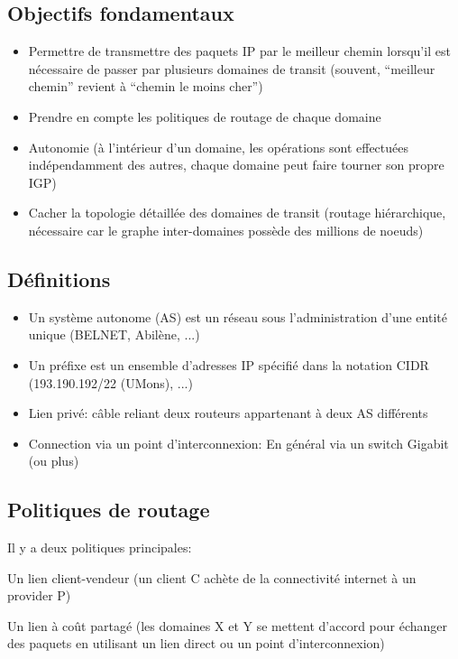 \documentclass{article}
\begin{document}
\begin{sffamily}
\subsection{Objectifs fondamentaux}

\begin{itemize}
\item Permettre de transmettre des paquets IP par le meilleur chemin
  lorsqu'il est nécessaire de passer par plusieurs domaines de transit
  (souvent, ``meilleur chemin'' revient à ``chemin le moins cher'')
\item Prendre en compte les politiques de routage de chaque domaine
\item Autonomie (à l'intérieur d'un domaine, les opérations sont
  effectuées indépendamment des autres, chaque domaine peut faire
  tourner son propre IGP)
\item Cacher la topologie détaillée des domaines de transit (routage
  hiérarchique, nécessaire car le graphe inter-domaines possède des
  millions de noeuds)
\end{itemize}

\subsection{Définitions}

\begin{itemize}
\item Un système autonome (AS) est un réseau sous l'administration
  d'une entité unique (BELNET, Abilène, ...)
\item Un préfixe est un ensemble d'adresses IP spécifié dans la
  notation CIDR (193.190.192/22 (UMons), ...)
\item Lien privé: câble reliant deux routeurs appartenant à deux AS
  différents
\item Connection via un point d'interconnexion: En général via un
  switch Gigabit (ou plus)
\end{itemize}

\subsection{Politiques de routage}

Il y a deux politiques principales:

Un lien client-vendeur (un client C achète de la connectivité internet
à un provider P)

Un lien à coût partagé (les domaines X et Y se mettent d'accord pour
échanger des paquets en utilisant un lien direct ou un point
d'interconnexion)


\end{sffamily}
\end{document}
